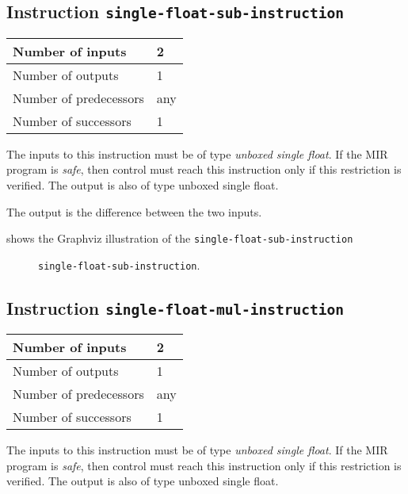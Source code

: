 \subsection{Instruction \texttt{single-float-sub-instruction}}
\label{mir-instruction-single-float-sub}

\begin{tabular}{|l|l|}
\hline
Number of inputs & 2\\
\hline
Number of outputs & 1\\
\hline
Number of predecessors & any\\
\hline
Number of successors & 1\\
\hline
\end{tabular}

The inputs to this instruction must be of type \emph{unboxed single
  float}.  If the MIR program is \emph{safe}, then control must reach
this instruction only if this restriction is verified.  The output is
also of type unboxed single float.

The output is the difference between the two inputs.

 shows the Graphviz illustration of the
\texttt{single-float-sub-instruction}

\begin{figure}
\begin{center}
\end{center}
\caption{\label{fig-single-float-sub-instruction}
\texttt{single-float-sub-instruction}.}
\end{figure}

\subsection{Instruction \texttt{single-float-mul-instruction}}
\label{mir-instruction-single-float-mul}

\begin{tabular}{|l|l|}
\hline
Number of inputs & 2\\
\hline
Number of outputs & 1\\
\hline
Number of predecessors & any\\
\hline
Number of successors & 1\\
\hline
\end{tabular}

The inputs to this instruction must be of type \emph{unboxed single
  float}.  If the MIR program is \emph{safe}, then control must reach
this instruction only if this restriction is verified.  The output is
also of type unboxed single float.

